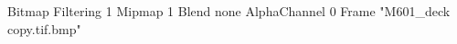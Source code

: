 {Bitmap
	{Filtering 1}
	{Mipmap 1}
	{Blend none}
	{AlphaChannel 0}
	{Frame "M601_deck copy.tif.bmp"}
}
